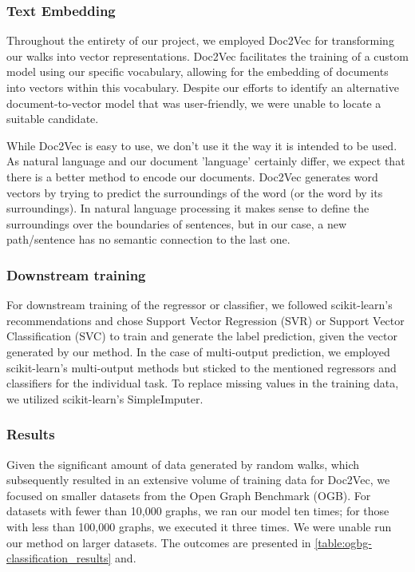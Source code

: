 \subsubsection{Text Embedding}
Throughout the entirety of our project, we employed Doc2Vec\cite{2014doc2vec} for transforming our walks into vector representations. Doc2Vec facilitates the training of a custom model using our specific vocabulary, allowing for the embedding of documents into vectors within this vocabulary. Despite our efforts to identify an alternative document-to-vector model that was user-friendly, we were unable to locate a suitable candidate.

While Doc2Vec is easy to use, we don't use it the way it is intended to be used. As natural language and our document 'language' certainly differ, we expect that there is a better method to encode our documents. Doc2Vec generates word vectors by trying to predict the surroundings of the word (or the word by its surroundings). In natural language processing it makes sense to define the surroundings over the boundaries of sentences, but in our case, a new path/sentence has no semantic connection to the last one.


\subsubsection{Downstream training}
For downstream training of the regressor or classifier, we followed scikit-learn's recommendations and chose Support Vector Regression (SVR) or Support Vector Classification (SVC) to train and generate the label prediction, given the vector generated by our method. In the case of multi-output prediction, we employed scikit-learn's multi-output methods but sticked to the mentioned regressors and classifiers for the individual task. To replace missing values in the training data, we utilized scikit-learn's SimpleImputer.

\subsubsection{Results}
Given the significant amount of data generated by random walks, which subsequently resulted in an extensive volume of training data for Doc2Vec, we focused on smaller datasets from the Open Graph Benchmark (OGB). For datasets with fewer than 10,000 graphs, we ran our model ten times; for those with less than 100,000 graphs, we executed it three times. We were unable run our method on larger datasets. The outcomes are presented in \autoref{table:ogbg-classification_results} and.

